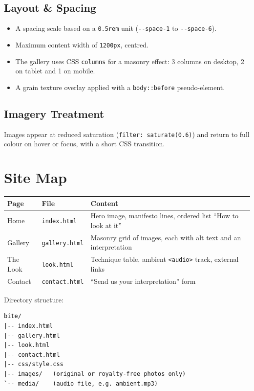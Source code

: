 \documentclass[11pt,a4paper]{article}
\begin{document}
\subsection{Layout \& Spacing}
\begin{itemize}
  \item A spacing scale based on a \texttt{0.5rem} unit (\texttt{-{}-space-1} to \texttt{-{}-space-6}).
  \item Maximum content width of \texttt{1200px}, centred.
  \item The gallery uses CSS \texttt{columns} for a masonry effect: 3 columns on desktop,
        2 on tablet and 1 on mobile.
  \item A grain texture overlay applied with a \texttt{body::before} pseudo-element.
\end{itemize}

\subsection{Imagery Treatment}
Images appear at reduced saturation (\texttt{filter: saturate(0.6)}) and return to full
colour on hover or focus, with a short CSS transition.

\section{Site Map}

\begin{center}
\begin{tabularx}{\textwidth}{l l L}
\toprule
\textbf{Page} & \textbf{File} & \textbf{Content} \\
\midrule
Home        & \texttt{index.html}   & Hero image, manifesto lines, ordered list ``How to look at it'' \\
Gallery     & \texttt{gallery.html} & Masonry grid of images, each with alt text and an interpretation \\
The Look    & \texttt{look.html}    & Technique table, ambient \texttt{<audio>} track, external links \\
Contact     & \texttt{contact.html} & ``Send us your interpretation'' form \\
\bottomrule
\end{tabularx}
\end{center}

\noindent Directory structure:
\begin{verbatim}
bite/
|-- index.html
|-- gallery.html
|-- look.html
|-- contact.html
|-- css/style.css
|-- images/   (original or royalty-free photos only)
`-- media/    (audio file, e.g. ambient.mp3)
\end{verbatim}
\end{document}

